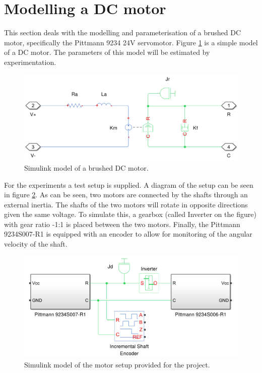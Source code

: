\section{Modelling a DC motor}
This section deals with the modelling and parameterisation of a brushed DC motor, specifically the Pittmann 9234 24V servomotor.
Figure \ref{fig:dcmotormodel} is a simple model of a DC motor.
The parameters of this model will be estimated by experimentation.

\begin{figure}[!h]
	\centering
	\includegraphics[width=\linewidth]{graphics/dcmotormodel.png}
	\caption{Simulink model of a brushed DC motor.}
	\label{fig:dcmotormodel}
\end{figure}

For the experiments a test setup is supplied. 
A diagram of the setup can be seen in figure \ref{fig:motorsetup}. 
As can be seen, two motors are connected by the shafts through an external inertia.
The shafts of the two motors will rotate in opposite directions given the same voltage.
To simulate this, a gearbox (called Inverter on the figure) with gear ratio -1:1 is placed between the two motors.
Finally, the Pittmann 9234S007-R1 is equipped with an encoder to allow for monitoring of the angular velocity of the shaft.


\begin{figure}[!h]
	\centering
	\includegraphics[width=.8\linewidth]{graphics/motorsetup.png}
	\caption{Simulink model of the motor setup provided for the project.}
	\label{fig:motorsetup}
\end{figure}

